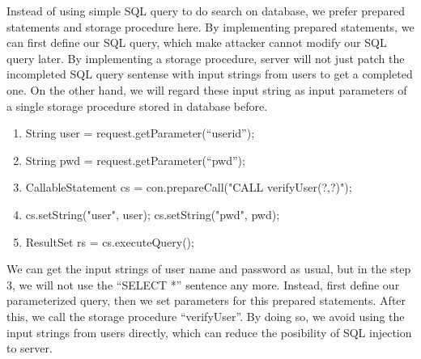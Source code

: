 \documentclass[12pt]{article}
\begin{document}
Instead of using simple SQL query to do search on database, we prefer prepared statements and storage procedure here. By implementing prepared statements, we can first define our SQL query, which make attacker cannot modify our SQL query later. By implementing a storage procedure, server will not just patch the incompleted SQL query sentense with input strings from users to get a completed one. On the other hand, we will regard these input string as input parameters of a single storage procedure stored in database before. \\
\begin{enumerate}
\item String user = request.getParameter(``userid''); 
\item String pwd = request.getParameter(``pwd'');
\item CallableStatement cs = con.prepareCall("{CALL verifyUser(?,?)}");
\item cs.setString("user", user); cs.setString("pwd", pwd);
\item ResultSet rs = cs.executeQuery();	
\end{enumerate} 
We can get the input strings of user name and password as usual, but in the step 3, we will not use the ``SELECT *'' sentence any more. Instead, first define our parameterized query, then we set parameters for this prepared statements. After this, we call the storage procedure ``verifyUser''. By doing so, we avoid using the input strings from users directly, which can reduce the posibility of SQL injection to server.
\end{document}
